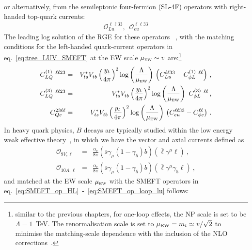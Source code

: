 or alternatively, from the semileptonic four-fermion (SL-4F) operators with right-handed top-quark currents:
\begin{eqnarray} 
	\label{eq:SMEFT_op_loop_lu}
		\mathcal{O}_{Lu}^{\ell \ell 3 3}, \,	\,\,	\mathcal{O}_{eu}^{\ell \ell 3 3} 
\end{eqnarray}
The leading log solution of the RGE for these operators ~\cite{Jenkins:2013zja,Jenkins:2013wua}, with the matching conditions for the left-handed quark-current operators in eq.~\eqref{eq:tree_LUV_SMEFT} at the  EW scale $\mu_{\textrm{\tiny{EW}}}\sim v $ are:\footnote{similar to the previous chapters, for one-loop effects,  the NP scale is set to be $\Lambda = 1$~TeV.  The renormalisation scale is set to $\mu_{\rm EW} = m_t\simeq v/\sqrt{2}$ to minimise the matching-scale dependence with the inclusion of the NLO corrections~\cite{Aebischer:2015fzz,Bobeth:2017xry}.}
\begin{eqnarray}
	\label{eq:SMEFT_matching_1loop}
	C_{LQ}^{(1)}\ ^{\ell \ell 23} &=& V_{ts}^{*} V^{ }_{tb} \left(\frac{y_{t} }{4 \pi}\right)^2 \log \left( \frac{\Lambda}{\mu_{\textrm{\tiny{EW}}}} \right)   \, \left(C_{Lu}^{\ell \ell 3 3} - C_{\phi L}^{(1)}\ ^{\ell \ell} \right)\,,\nonumber \\
		C_{LQ}^{(3)}\ ^{\ell \ell 23} &=& V_{ts}^{*} V^{ }_{tb} \left(\frac{y_{t} }{4 \pi}\right)^2 \log \left( \frac{\Lambda}{\mu_{\textrm{\tiny{EW}}}} \right)  \ C_{\phi L}^{(3)}\ ^{\ell \ell}  \,,\nonumber \\
	C_{Qe}^{23\ell \ell} &=& V_{ts}^{*} V^{ }_{tb} \left(\frac{y_{t} }{4 \pi}\right)^2 \log \left( \frac{\Lambda}{\mu_{\textrm{\tiny{EW}}}} \right)   \, \left( C_{eu}^{\ell \ell 3 3} - C^{\ell \ell}_{\phi e}\right) \, .
\end{eqnarray}
In heavy quark physics, $B$ decays are typically studied within the low energy weak effective theory~\cite{Buchalla:1995vs,Buras:1998raa,Silvestrini:2019sey}, in which we have the vector and axial currents defined as
\begin{eqnarray}
	\label{eq:_Q9_Q10}
	\mathcal{O}_{9 V, \ell} & = & \frac{\alpha_{e}}{8 \pi} (\bar{s} \gamma_{\mu} (1-\gamma_{5})b) ( \bar{\ell} \gamma^{\mu} \ell ) \nonumber \ , \ \\
	\mathcal{O}_{10 A, \ell} & = & \frac{\alpha_{e}}{8 \pi} (\bar{s} \gamma_{\mu} (1-\gamma_{5})b) ( \bar{\ell} \gamma^{\mu} \gamma_{5} \ell ) \ ,
\end{eqnarray}
and matched at the EW scale $\mu_{\textrm{\tiny{EW}}}$  with the SMEFT operators in  eq.~\eqref{eq:SMEFT_op_HL}~-~\eqref{eq:SMEFT_op_loop_lu} follows:
